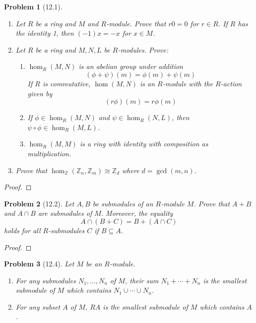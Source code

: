 \documentclass[10pt]{article}
\newcommand{\sk}{\vskip 10mm}
\newcommand{\bb}[1]{\mathbb{#1}}
\theoremstyle{plain}
\newtheorem{problem}{Problem}
\theoremstyle{remark}
\begin{document}
\begin{problem}[12.1]
  \begin{enumerate}
  \item Let $R$ be a ring and $M$ and $R$-module. Prove that $r0=0$
    for $r\in R$. If $R$ has the identity 1, then $(-1)x=-x$ for $x\in M$.
  \item Let $R$ be a ring and $M,N,L$ be $R$-modules. Prove:
    \begin{enumerate}
    \item $\hom_R(M,N)$ is an abelian group under addition
      \[ (\phi+\psi)(m)=\phi(m)+\psi(m) \]
      If $R$ is commutative, $\hom(M,N)$ is an $R$-module with the $R$-action
      given by
      \[ (r\phi)(m)=r\phi(m)\]
    \item If $\phi\in\hom_R(M,N)$ and $\psi\in\hom_R(N,L)$, then $\psi\circ\phi\in\hom_R(M,L)$.
    \item $\hom_R(M,M)$ is a ring with identity with composition as
      multiplication.
    \end{enumerate}
  \item Prove that $\hom_{\bb{Z}}(\bb{Z}_n,\bb{Z}_m)\cong\bb{Z}_d$ where
    $d=\gcd(m,n)$.
  \end{enumerate}
\end{problem}

\begin{proof}
  
\end{proof}

\sk

\begin{problem}[12.2]
  Let $A,B$ be submodules of an $R$-module $M$. Prove that $A+B$
  and $A\cap B$ are submodules of $M$. Moreover, the equality
  \[ A\cap(B+C)=B+(A\cap C)\]
  holds for all $R$-submodules $C$ if $B\subseteq A$.
\end{problem}

\begin{proof}
  
\end{proof}

\sk

\begin{problem}[12.4]
  Let $M$ be an $R$-module.
  \begin{enumerate}
  \item For any submodules $N_1,\ldots,N_n$ of $M$, their sum
    $N_1+\cdots+N_n$ is the smallest submodule of $M$ which contains
    $N_1\cup\cdots\cup N_n$.
  \item For any subset $A$ of $M$, $RA$ is the smallest submodule
    of $M$ which contains $A$.
  \end{enumerate}
\end{problem}
\end{document}
